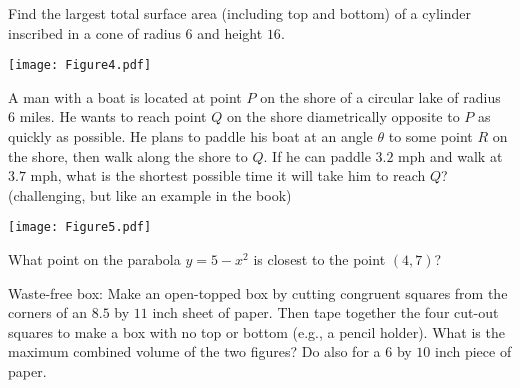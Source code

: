 \documentclass[nooutcomes]{ximera}
\begin{document}
\begin{problem}
Find the largest total surface area (including top and bottom) of a cylinder inscribed in a cone of radius $6$ and height $16$. 

		\begin{image}
		\texttt{[image: Figure4.pdf]}
		\end{image}
\end{problem}



\begin{problem}
A man with a boat is located at point $P$ on the shore of a circular lake of radius $6$ miles.  He wants to reach point $Q$ on the shore diametrically opposite to $P$ as quickly as possible.  He plans to paddle his boat at an angle $\theta$ to some point $R$ on the shore, then walk along the shore to $Q$.  If he can paddle $3.2$ mph and walk at $3.7$ mph, what is the shortest possible time it will take him to reach $Q$? (challenging, but like an example in the book)

		\begin{image}
		\texttt{[image: Figure5.pdf]}
		\end{image}
\end{problem}



\begin{problem}
What point on the parabola $y=5-x^2$ is closest to the point $(4,7)$?  
\end{problem}



\begin{problem}
Waste-free box: Make an open-topped box by cutting congruent squares from the corners of an $8.5$ by $11$ inch sheet of paper.  Then tape together the four cut-out squares to make a box with no top or bottom (e.g., a pencil holder).  What is the maximum combined volume of the two figures?  Do also for a $6$ by $10$ inch piece of paper.
\end{problem}
\end{document}
